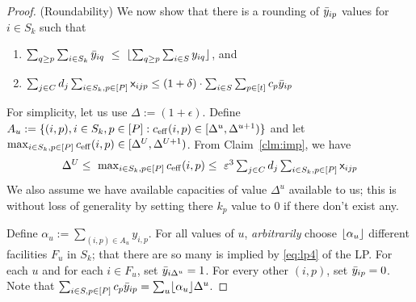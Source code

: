 \begin{proof}
\noindent
(Roundability)
We now show that there is a rounding of $\bar{y}_{ip}$ values for $i\in S_k$ such that
		\begin{enumerate}
			\item $\sum_{q \geq p} \sum_{i\in S_k} \bar{y}_{iq} ~\leq~ \lfloor\sum_{q \geq p}\sum_{i\in S} y_{iq}\rfloor$, and
			\item $\sum_{j\in C} d_j \sum_{i\in S_k,p\in [P]} {\mathsf x}_{ijp} \leq (1+\delta)\cdot \sum_{i\in S} \sum_{p\in [t]} c_p\bar{y}_{ip}$
		\end{enumerate}

\noindent
For simplicity, let us use $\Delta := (1+\epsilon)$.
Define $A_u := \{(i,p), i\in S_k,p\in [P]: c_{\mathrm{eff}}(i,p) \in [\Delta^u,\Delta^{u+1})\}$ and let $\max_{i\in S_k,p\in [P]} c_{\mathrm{eff}}(i,p) \in [\Delta^U,\Delta^{U+1})$.
From Claim~\ref{clm:imp}, we have
\[
\textstyle \Delta^U \leq ~ \max_{i\in S_k,p\in [P]} c_{\mathrm{eff}}(i,p) \leq ~\varepsilon^3 \sum_{j\in C} d_j \sum_{i\in S_k,p\in [P]} {\mathsf x}_{ijp}
\]
We also assume we have available capacities of value $\Delta^u$ available to us; this is without loss of generality by setting there $k_p$ value to $0$
if there don't exist any.

Define $\alpha_u := \sum_{(i,p) \in A_u} y_{i,p}$. For all values of $u$, 
{\em arbitrarily} choose $\lfloor\alpha_u\rfloor$ different facilities $F_u$ in $S_k$; that there are so many is implied by \eqref{eq:lp4} of the LP.
For each $u$ and for each $i\in F_u$, set $\bar{y}_{i\Delta^u} = 1$. For every other $(i,p)$, set $\bar{y}_{ip} = 0$. 
Note that  $\sum_{i\in S,p\in [P]}c_p\bar{y}_{ip} = \sum_u \lfloor\alpha_u\rfloor\Delta^u$.


\end{proof}
